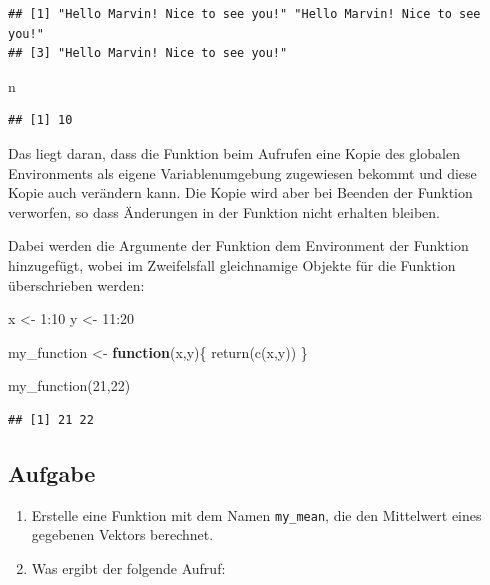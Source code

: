 \documentclass[
]{book}
\newenvironment{Shaded}{\begin{snugshade}}{\end{snugshade}}
\newcommand{\ControlFlowTok}[1]{\textcolor[rgb]{0.13,0.29,0.53}{\textbf{#1}}}
\newcommand{\DecValTok}[1]{\textcolor[rgb]{0.00,0.00,0.81}{#1}}
\newcommand{\FunctionTok}[1]{\textcolor[rgb]{0.00,0.00,0.00}{#1}}
\newcommand{\NormalTok}[1]{#1}
\newcommand{\OtherTok}[1]{\textcolor[rgb]{0.56,0.35,0.01}{#1}}
\newcommand{\SpecialCharTok}[1]{\textcolor[rgb]{0.00,0.00,0.00}{#1}}
\begin{document}
\begin{verbatim}
## [1] "Hello Marvin! Nice to see you!" "Hello Marvin! Nice to see you!"
## [3] "Hello Marvin! Nice to see you!"
\end{verbatim}

\begin{Shaded}
\begin{Highlighting}[]
\NormalTok{n}
\end{Highlighting}
\end{Shaded}

\begin{verbatim}
## [1] 10
\end{verbatim}

Das liegt daran, dass die Funktion beim Aufrufen eine Kopie des globalen Environments als eigene Variablenumgebung zugewiesen bekommt und diese Kopie auch verändern kann. Die Kopie wird aber bei Beenden der Funktion verworfen, so dass Änderungen in der Funktion nicht erhalten bleiben.

Dabei werden die Argumente der Funktion dem Environment der Funktion hinzugefügt, wobei im Zweifelsfall gleichnamige Objekte für die Funktion überschrieben werden:

\begin{Shaded}
\begin{Highlighting}[]
\NormalTok{x }\OtherTok{\textless{}{-}} \DecValTok{1}\SpecialCharTok{:}\DecValTok{10}
\NormalTok{y }\OtherTok{\textless{}{-}} \DecValTok{11}\SpecialCharTok{:}\DecValTok{20}

\NormalTok{my\_function }\OtherTok{\textless{}{-}} \ControlFlowTok{function}\NormalTok{(x,y)\{}
  \FunctionTok{return}\NormalTok{(}\FunctionTok{c}\NormalTok{(x,y))}
\NormalTok{\}}

\FunctionTok{my\_function}\NormalTok{(}\DecValTok{21}\NormalTok{,}\DecValTok{22}\NormalTok{)}
\end{Highlighting}
\end{Shaded}

\begin{verbatim}
## [1] 21 22
\end{verbatim}

\hypertarget{aufgabe}{%
\subsection{Aufgabe}\label{aufgabe}}

\begin{enumerate}
\def\labelenumi{\arabic{enumi}.}
\item
  Erstelle eine Funktion mit dem Namen \texttt{my\_mean}, die den Mittelwert eines gegebenen Vektors berechnet.
\item
  Was ergibt der folgende Aufruf:
\end{enumerate}
\end{document}
